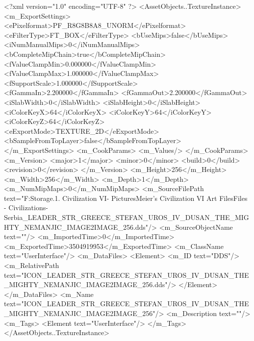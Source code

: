 <?xml version="1.0" encoding="UTF-8" ?>
<AssetObjects..TextureInstance>
	<m_ExportSettings>
		<ePixelformat>PF_R8G8B8A8_UNORM</ePixelformat>
		<eFilterType>FT_BOX</eFilterType>
		<bUseMips>false</bUseMips>
		<iNumManualMips>0</iNumManualMips>
		<bCompleteMipChain>true</bCompleteMipChain>
		<fValueClampMin>0.000000</fValueClampMin>
		<fValueClampMax>1.000000</fValueClampMax>
		<fSupportScale>1.000000</fSupportScale>
		<fGammaIn>2.200000</fGammaIn>
		<fGammaOut>2.200000</fGammaOut>
		<iSlabWidth>0</iSlabWidth>
		<iSlabHeight>0</iSlabHeight>
		<iColorKeyX>64</iColorKeyX>
		<iColorKeyY>64</iColorKeyY>
		<iColorKeyZ>64</iColorKeyZ>
		<eExportMode>TEXTURE_2D</eExportMode>
		<bSampleFromTopLayer>false</bSampleFromTopLayer>
	</m_ExportSettings>
	<m_CookParams>
		<m_Values/>
	</m_CookParams>
	<m_Version>
		<major>1</major>
		<minor>0</minor>
		<build>0</build>
		<revision>0</revision>
	</m_Version>
	<m_Height>256</m_Height>
	<m_Width>256</m_Width>
	<m_Depth>1</m_Depth>
	<m_NumMipMaps>0</m_NumMipMaps>
	<m_SourceFilePath text="F:\Mod Storage\2.1. Civilization VI\Mods\Archive - Pictures\Sid Meier's Civilization VI Art Files\Art Files - Civilizations\Civilization - Serbia\ICON_LEADER_STR_GREECE_STEFAN_UROS_IV_DUSAN_THE_MIGHTY_NEMANJIC_IMAGE2IMAGE_256.dds"/>
	<m_SourceObjectName text=""/>
	<m_ImportedTime>0</m_ImportedTime>
	<m_ExportedTime>3504919953</m_ExportedTime>
	<m_ClassName text="UserInterface"/>
	<m_DataFiles>
		<Element>
			<m_ID text="DDS"/>
			<m_RelativePath text="ICON_LEADER_STR_GREECE_STEFAN_UROS_IV_DUSAN_THE_MIGHTY_NEMANJIC_IMAGE2IMAGE_256.dds"/>
		</Element>
	</m_DataFiles>
	<m_Name text="ICON_LEADER_STR_GREECE_STEFAN_UROS_IV_DUSAN_THE_MIGHTY_NEMANJIC_IMAGE2IMAGE_256"/>
	<m_Description text=""/>
	<m_Tags>
		<Element text="UserInterface"/>
	</m_Tags>
</AssetObjects..TextureInstance>

